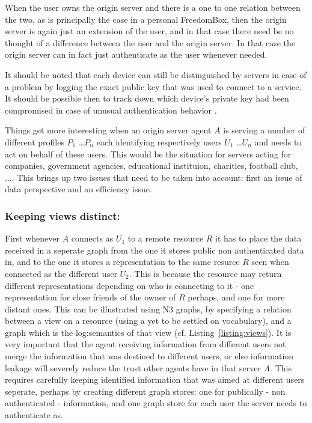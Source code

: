 \documentclass[a4paper]{llncs}
\begin{document}
When the user owns the origin server and there is a one to one relation between the two, as is principally the case in a personal FreedomBox, then the origin server is again just an extension of the user, and in that case there need be no thought of a difference between the user and the origin server.
In that case the origin server can in fact just authenticate as the user whenever needed. 

It should be noted that each device can still be distinguished by servers in case of a problem by logging the exact public key that was used to connect to a service. 
It should be possible then to track down which device's private key had been compromised in case of unusual authentication behavior . 

Things get more interesting when an origin server agent $A$ is serving a number of different profiles $P_1$ \ldots $P_n$ each identifying respectively users $U_1$ \ldots $U_n$ and needs to act on behalf of these users.
This would be the situation for servers acting for companies, government agencies, educational instituion, charities, football club, ....
This brings up two issues that need to be taken into account: first an issue of data perspective and an efficiency issue. 

\subsubsection{Keeping views distinct: }

First whenever $A$ connects as $U_1$ to a remote resource $R$ it has to place the data received in a seperate graph from the one it stores public non authenticated data in, and to the one it stores a representation to the same resurce $R$ seen when connected as the different user $U_2$. 
This is because the resource may return different representations depending on who is connecting to it - one representation for close friends of the owner of $R$ perhaps, and one for more distant ones. 
This can be illustrated using N3 graphs, by specifying a relation between a view on a resource (using a yet to be settled on vocabulary), and a graph which is the log:semantics of that view (cf. Listing~\ref{listing:views}). 
It is very important that the agent receiving information from different users not merge the information that was destined to different users, or else information leakage will severely reduce the trust other agents have in that server $A$. 
This requires carefully keeping identified information that was aimed at different users seperate, perhaps by creating different graph stores: one for publically - non authenticated - information, and one graph store for each user the server needs to authenticate as.
\end{document}
